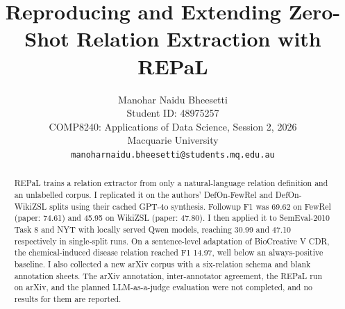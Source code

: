 \documentclass[11pt]{article}
\title{Reproducing and Extending Zero-Shot Relation Extraction with REPaL}
\author{Manohar Naidu Bheesetti \\
  Student ID: 48975257 \\
  COMP8240: Applications of Data Science, Session 2, 2026 \\
  Macquarie University \\
  \texttt{manoharnaidu.bheesetti@students.mq.edu.au}}
\begin{document}
\maketitle

\begin{abstract}
REPaL trains a relation extractor from only a natural-language relation definition and an unlabelled corpus. I replicated it on the authors' DefOn-FewRel and DefOn-WikiZSL splits using their cached GPT-4o synthesis. Followup F1 was 69.62 on FewRel (paper: 74.61) and 45.95 on WikiZSL (paper: 47.80). I then applied it to SemEval-2010 Task 8 and NYT with locally served Qwen models, reaching 30.99 and 47.10 respectively in single-split runs. On a sentence-level adaptation of BioCreative V CDR, the chemical-induced disease relation reached F1 14.97, well below an always-positive baseline. I also collected a new arXiv corpus with a six-relation schema and blank annotation sheets. The arXiv annotation, inter-annotator agreement, the REPaL run on arXiv, and the planned LLM-as-a-judge evaluation were not completed, and no results for them are reported.
\end{abstract}











\end{document}
